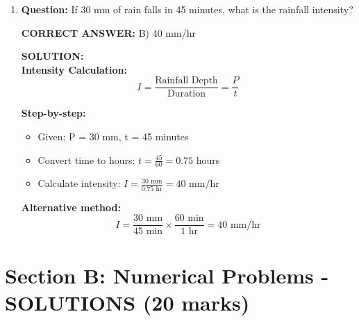 \documentclass[11pt,a4paper]{article}
\newenvironment{correctanswer}
    {\color{correct}\textbf{CORRECT ANSWER: }}
    {}
\newenvironment{solutionbox}
    {\color{solution}\begin{framed}\textbf{SOLUTION:}\\\vspace{0.2cm}}
    {\end{framed}}
\begin{document}
\begin{enumerate}
\item \textbf{Question:} If 30 mm of rain falls in 45 minutes, what is the rainfall intensity?

\begin{correctanswer}
B) 40 mm/hr
\end{correctanswer}

\begin{solutionbox}
\textbf{Intensity Calculation:}
$$I = \frac{\text{Rainfall Depth}}{\text{Duration}} = \frac{P}{t}$$

\textbf{Step-by-step:}
\begin{itemize}[nosep]
    \item Given: P = 30 mm, t = 45 minutes
    \item Convert time to hours: $t = \frac{45}{60} = 0.75$ hours
    \item Calculate intensity: $I = \frac{30 \text{ mm}}{0.75 \text{ hr}} = 40 \text{ mm/hr}$
\end{itemize}

\textbf{Alternative method:}
$$I = \frac{30 \text{ mm}}{45 \text{ min}} \times \frac{60 \text{ min}}{1 \text{ hr}} = 40 \text{ mm/hr}$$
\end{solutionbox}

\end{enumerate}

\newpage

\section*{Section B: Numerical Problems - SOLUTIONS (20 marks)}
\end{document}
